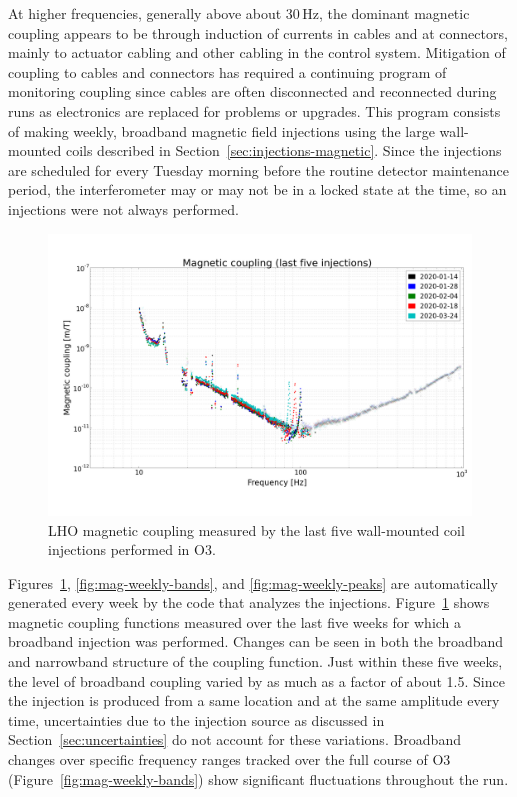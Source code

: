 At higher frequencies, generally above about 30\,Hz, the dominant magnetic coupling appears to be through induction of currents in cables and at connectors, mainly to actuator cabling and other cabling in the control system.
Mitigation of coupling to cables and connectors has required a continuing program of monitoring coupling since cables are often disconnected and reconnected during runs as electronics are replaced for problems or upgrades.
This program consists of making weekly, broadband magnetic field injections using the large wall-mounted coils described in Section~\ref{sec:injections-magnetic}.
Since the injections are scheduled for every Tuesday morning before the routine detector maintenance period, the interferometer may or may not be in a locked state at the time, so an injections were not always performed.

\begin{figure}[h]
	\centering
	\includegraphics[width=\textwidth]{figures/noise-studies/mag-weekly-cf.png}
	\caption{
		LHO magnetic coupling measured by the last five wall-mounted coil injections performed in O3.}
	\label{fig:mag-weekly-cf}
\end{figure}

Figures~\ref{fig:mag-weekly-cf}, \ref{fig:mag-weekly-bands}, and \ref{fig:mag-weekly-peaks} are automatically generated every week by the code that analyzes the injections.
Figure~\ref{fig:mag-weekly-cf} shows magnetic coupling functions measured over the last five weeks for which a broadband injection was performed.
Changes can be seen in both the broadband and narrowband structure of the coupling function.
Just within these five weeks, the level of broadband coupling varied by as much as a factor of about 1.5.
Since the injection is produced from a same location and at the same amplitude every time, uncertainties due to the injection source as discussed in Section~\ref{sec:uncertainties} do not account for these variations.
Broadband changes over specific frequency ranges tracked over the full course of \ac{O3} (Figure~\ref{fig:mag-weekly-bands}) show significant fluctuations throughout the run.

